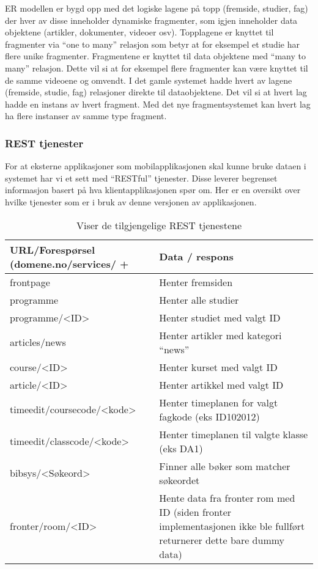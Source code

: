 \documentclass[../main.tex]{subfiles}
\begin{document}
ER modellen er bygd opp med det logiske lagene på topp (fremside, studier, fag) der hver av disse inneholder dynamiske fragmenter, som igjen inneholder data objektene (artikler, dokumenter, videoer osv). Topplagene er knyttet til fragmenter via “one to many” relasjon som betyr at for eksempel et studie har flere unike fragmenter. Fragmentene er knyttet til data objektene med “many to many” relasjon. Dette vil si at for eksempel flere fragmenter kan være knyttet til de samme videoene og omvendt.\newline
\newline
I det gamle systemet hadde hvert av lagene (fremside, studie, fag) relasjoner direkte til dataobjektene. Det vil si at hvert lag hadde en instans av hvert fragment. Med det nye fragmentsystemet kan hvert lag ha flere instanser av samme type fragment.

\subsubsection{REST tjenester}

For at eksterne applikasjoner som mobilapplikasjonen skal kunne bruke dataen i systemet har vi et sett med “RESTful” tjenester. Disse leverer begrenset informasjon basert på hva klientapplikasjonen spør om. Her er en oversikt over hvilke tjenester som er i bruk av denne versjonen av applikasjonen.

\begin{table}[H]
\begin{center}
\caption{Viser de tilgjengelige REST tjenestene}
  \begin{tabular}{ | p{5cm} | p{8cm} |}
    \hline
    URL/Forespørsel (domene.no/services/ + & Data / respons \\ \hline
    frontpage & Henter fremsiden \\ \hline
    programme & Henter alle studier \\ \hline
    programme/<ID> & Henter studiet med valgt ID \\ \hline
    articles/news & Henter artikler med kategori “news” \\ \hline
    course/<ID> & Henter kurset med valgt ID \\ \hline
    article/<ID> & Henter artikkel med valgt ID \\ \hline
    timeedit/coursecode/<kode> & Henter timeplanen for valgt fagkode (eks ID102012) \\ \hline
    timeedit/classcode/<kode> & Henter timeplanen til valgte klasse (eks DA1) \\ \hline
    bibsys/<Søkeord> & Finner alle bøker som matcher søkeordet \\ \hline
    fronter/room/<ID> & Hente data fra fronter rom med ID (siden fronter implementasjonen ikke ble fullført returnerer dette bare dummy data) \\
    \hline
  \end{tabular}
\end{center}
\end{table}
\end{document}
